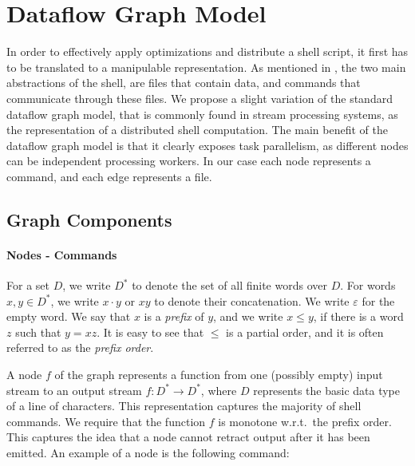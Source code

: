 \documentclass[sigplan,10pt,review,anonymous]{acmart}
\newcommand{\nv}[1]{[{\color{cyan}#1 --- nv}]}
\newcommand{\tr}[1]{} %
\newcommand{\kstar}{^{\textstyle *}}
\newcommand{\eps}{\varepsilon}
\begin{document}
\tr{Can we find a solution for the commands in coreutils?}


\section{Dataflow Graph Model}
\label{ir}

In order to effectively apply optimizations and distribute a shell
script, it first has to be translated to a manipulable
representation. As mentioned in , the two main
abstractions of the shell, are files that contain data, and commands
that communicate through these files. We propose a slight variation of
the standard dataflow graph model, that is commonly found in stream
processing systems, as the representation of a distributed shell
computation. The main benefit of the dataflow graph model is that it
clearly exposes task parallelism, as different nodes can be
independent processing workers. In our case each node represents a
command, and each edge represents a file.

\subsection{Graph Components}

\paragraph{Nodes - Commands}

For a set $D$, we write $D\kstar$ to denote the set of all finite
words over $D$. For words $x, y \in D\kstar$, we write $x \cdot y$
or $xy$ to denote their concatenation. We write $\eps$ for the empty
word. We say that $x$ is a \emph{prefix} of $y$, and we write $x \leq y$, if there is a word $z$ such that $y = xz$. It is easy to see that $\leq$ is a partial order, and it is often referred to as the \emph{prefix order}.

A node $f$ of the graph represents a function from one (possibly empty)
input stream to an output stream $f : D\kstar \to D\kstar$, where $D$
represents the basic data type of a line of characters. This
representation captures the majority of shell commands. We require that
the function $f$ is monotone w.r.t.\ the prefix order. This captures
the idea that a node cannot retract output after it has been emitted.
An example of a node is the following command:
\end{document}
